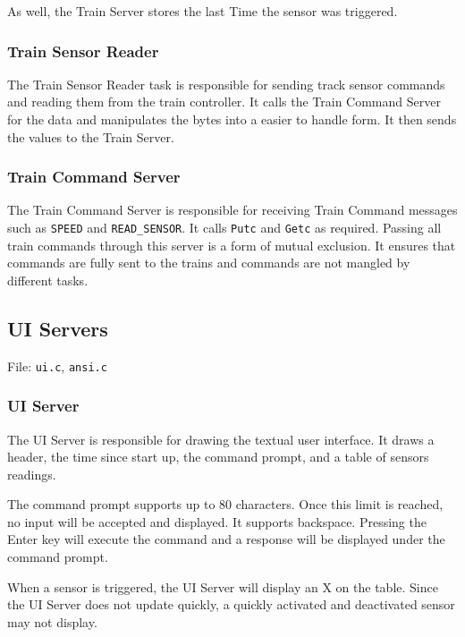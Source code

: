\documentclass[letterpaper]{article}
\begin{document}
As well, the Train Server stores the last Time the sensor was triggered.


\subsubsection{Train Sensor Reader%
  \label{train-sensor-reader}%
}

The Train Sensor Reader task is responsible for sending track sensor commands and reading them from the train controller. It calls the Train Command Server for the data and manipulates the bytes into a easier to handle form. It then sends the values to the Train Server.


\subsubsection{Train Command Server%
  \label{train-command-server}%
}

The Train Command Server is responsible for receiving Train Command messages such as \texttt{SPEED} and \texttt{READ\_SENSOR}. It calls \texttt{Putc} and \texttt{Getc} as required. Passing all train commands through this server is a form of mutual exclusion. It ensures that commands are fully sent to the trains and commands are not mangled by different tasks.


\subsection{UI Servers%
  \label{ui-servers}%
}

File: \texttt{ui.c}, \texttt{ansi.c}


\subsubsection{UI Server%
  \label{ui-server}%
}

The UI Server is responsible for drawing the textual user interface. It draws a header, the time since start up, the command prompt, and a table of sensors readings.

The command prompt supports up to 80 characters. Once this limit is reached, no input will be accepted and displayed. It supports backspace. Pressing the Enter key will execute the command and a response will be displayed under the command prompt.

When a sensor is triggered, the UI Server will display an X on the table. Since the UI Server does not update quickly, a quickly activated and deactivated sensor may not display.
\end{document}
